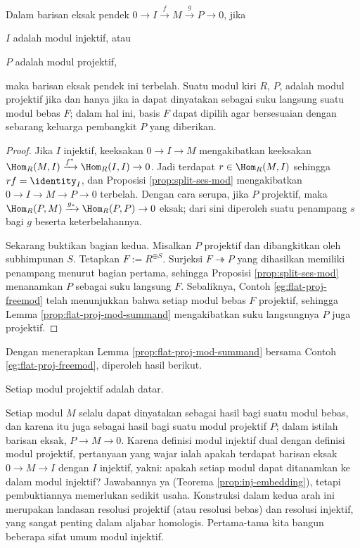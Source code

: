 \begin{proposition}\label{prop:proj-mod-characterization}
	Dalam barisan eksak pendek $0 \to I \xrightarrow{f} M \xrightarrow{g} P \to 0$, jika
	\begin{inparaenum}[(i)]
		\item $I$ adalah modul injektif, atau
		\item $P$ adalah modul projektif,
	\end{inparaenum}
	maka barisan eksak pendek ini terbelah. Suatu modul kiri $R$, $P$, adalah modul projektif jika dan hanya jika ia dapat dinyatakan sebagai suku langsung suatu modul bebas $F$; dalam hal ini, basis $F$ dapat dipilih agar bersesuaian dengan sebarang keluarga pembangkit $P$ yang diberikan.
\end{proposition}
\begin{proof}
	Jika $I$ injektif, keeksakan $0 \to I \to M$ mengakibatkan keeksakan $\Hom_R(M,I) \xrightarrow{f^*} \Hom_R(I,I) \to 0$. Jadi terdapat $r \in \Hom_R(M,I)$ sehingga $rf = \identity_I$, dan Proposisi \ref{prop:split-ses-mod} mengakibatkan $0 \to I \to M \to P \to 0$ terbelah. Dengan cara serupa, jika $P$ projektif, maka $\Hom_R(P,M) \xrightarrow{g_*} \Hom_R(P,P) \to 0$ eksak; dari sini diperoleh suatu penampang $s$ bagi $g$ beserta keterbelahannya.

	Sekarang buktikan bagian kedua. Misalkan $P$ projektif dan dibangkitkan oleh subhimpunan $S$. Tetapkan $F := R^{\oplus S}$. Surjeksi $F \twoheadrightarrow P$ yang dihasilkan memiliki penampang menurut bagian pertama, sehingga Proposisi \ref{prop:split-ses-mod} menanamkan $P$ sebagai suku langsung $F$. Sebaliknya, Contoh \ref{eg:flat-proj-freemod} telah menunjukkan bahwa setiap modul bebas $F$ projektif, sehingga Lemma \ref{prop:flat-proj-mod-summand} mengakibatkan suku langsungnya $P$ juga projektif.
\end{proof}

Dengan menerapkan Lemma \ref{prop:flat-proj-mod-summand} bersama Contoh \ref{eg:flat-proj-freemod}, diperoleh hasil berikut.
\begin{corollary}
	Setiap modul projektif adalah datar.
\end{corollary}

Setiap modul $M$ selalu dapat dinyatakan sebagai hasil bagi suatu modul bebas, dan karena itu juga sebagai hasil bagi suatu modul projektif $P$; dalam istilah barisan eksak, $P \to M \to 0$. Karena definisi modul injektif dual dengan definisi modul projektif, pertanyaan yang wajar ialah apakah terdapat barisan eksak $0 \to M \to I$ dengan $I$ injektif, yakni: apakah setiap modul dapat ditanamkan ke dalam modul injektif? Jawabannya ya (Teorema \ref{prop:inj-embedding}), tetapi pembuktiannya memerlukan sedikit usaha. Konstruksi dalam kedua arah ini merupakan landasan resolusi projektif (atau resolusi bebas) dan resolusi injektif, yang sangat penting dalam aljabar homologis. Pertama-tama kita bangun beberapa sifat umum modul injektif.

